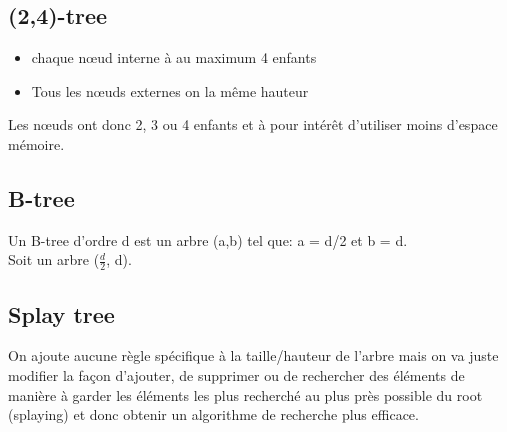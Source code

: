 \documentclass[a4paper]{article}
\begin{document}
\subsection{(2,4)-tree}
\begin{itemize}
\item chaque nœud interne à au maximum 4 enfants
\item Tous les nœuds externes on la même hauteur
\end{itemize}

Les nœuds ont donc 2, 3 ou 4 enfants et à pour intérêt d'utiliser moins d'espace mémoire.

\subsection{B-tree}
Un B-tree d'ordre d est un arbre (a,b) tel que:  a = d/2 et b = d.\\
Soit un arbre ($\frac{d}{2}$, d).

\subsection{Splay tree}
On ajoute aucune règle spécifique à la taille/hauteur de l'arbre mais on va juste modifier la façon d'ajouter, de supprimer ou de rechercher des éléments de manière à garder les éléments les plus recherché au plus près possible du root (splaying) et donc obtenir un algorithme de recherche plus efficace.
\end{document}
